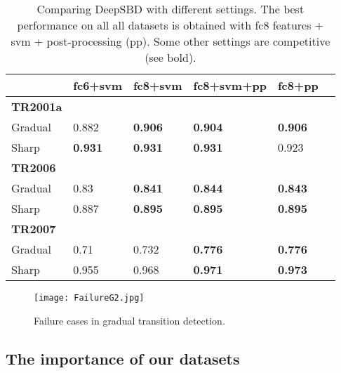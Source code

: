 \documentclass[journal]{IEEEtran}
\begin{document}
\begin{table}
\small
\centering
\begin{tabular}{| l | l | l | l | l | l | }
     \hline              
												    &   fc6+svm   & fc8+svm  &  fc8+svm+pp & fc8+pp      \\
     \hline
		\textbf{TR2001a} & & & &\\ 
		
	      Gradual   		          & 0.882  & \textbf{0.906}	& \textbf{0.904}	& \textbf{0.906} 	 \\
				
				Sharp                 & \textbf{0.931}	& \textbf{0.931}	& \textbf{0.931}	& 0.923	 \\
				\hline 		
		\textbf{TR2006} & & & &\\ 
		
	      Gradual   		          & 0.83  & \textbf{0.841}	& \textbf{0.844}	& \textbf{0.843} 	 \\
				
				Sharp                 & 0.887	& \textbf{0.895}	& \textbf{0.895}	& \textbf{0.895}	 \\
				\hline 		
						\textbf{TR2007} & & & &\\ 
		
	      Gradual   		          & 0.71  & 0.732	& \textbf{0.776}	& \textbf{0.776} 	 \\
				
				Sharp                 & 0.955	& 0.968	& \textbf{0.971}	& \textbf{0.973}	 \\
				\hline 	
							
    \end{tabular}\vspace{3pt}
\caption{Comparing DeepSBD with different settings. The best performance on all all datasets is obtained with fc8 features + svm + post-processing (pp). Some other settings are competitive (see bold).}
\label{tab:DifferentParameters}
\end{table}

\begin{figure}
  \centering
   \texttt{[image: FailureG2.jpg]}
   \caption{Failure cases in gradual transition detection.}
\label{fig:FailureG}
 \end{figure}

\subsection{The importance of our datasets}
\end{document}
